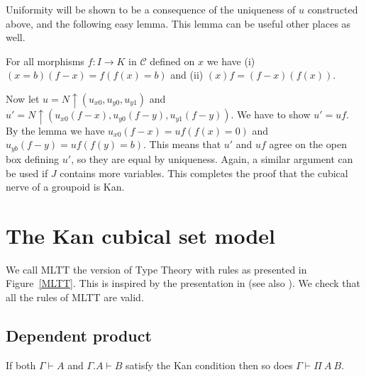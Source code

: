 \documentclass[10pt,a4paper]{article}
\newcommand{\CC}{{\mathcal C}}
\newcommand{\rup}[1]{#1{\uparrow}}
\begin{document}
Uniformity will be shown to be a consequence of the uniqueness of
$u$ constructed above, and the following easy lemma.
This lemma can be useful other places as well.
\begin{lemma}  For all morphisms $f:I\to K$ in $\CC$ defined on $x$ we have
(i) $(x=b)(f-x) = f (f(x)=b)$ and (ii) $(x)f = (f-x)(f(x))$.
\end{lemma}
Now let $u=\rup{N}(u_{x0},u_{y0},u_{y1})$ and
$u'=\rup{N}(u_{x0}(f-x),u_{y0}(f-y),u_{y1}(f-y))$.
We have to show $u'=uf$.
By the lemma we have $u_{x0}(f-x) = uf(f(x)=0)$ and $u_{yb}(f-y) = uf(f(y)=b)$.
This means that $u'$ and $uf$ agree on the open box defining $u'$,
so they are equal by uniqueness.
Again, a similar argument can be used if $J$ contains more variables.
This completes the proof that the cubical nerve of a groupoid is Kan.

\section{The Kan cubical set model}\label{cubsetmodel}

We call MLTT the version of Type Theory with rules as presented in
Figure~\ref{MLTT}.  This is inspired by the presentation in
\cite{Curien} (see also \cite{Dybjer}).  We check that all the rules
of MLTT are valid.

\subsection{Dependent product}

\begin{theorem}
  If both $\Gamma\vdash A$ and $\Gamma.A\vdash B$ satisfy the Kan
  condition then so does $\Gamma\vdash\Pi~A~B$.
\end{theorem}
\end{document}
